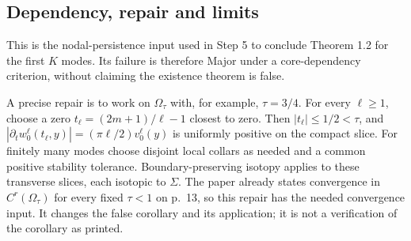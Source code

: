 \documentclass[10pt]{article}
\begin{document}
\subsection*{Dependency, repair and limits}
This is the nodal-persistence input used in Step 5 to conclude Theorem 1.2 for the first \(K\) modes. Its failure is therefore Major under a core-dependency criterion, without claiming the existence theorem is false.\par
A precise repair is to work on \(\Omega_\tau\) with, for example, \(\tau=3/4\). For every \(\ell\geq1\), choose a zero \(t_\ell=(2m+1)/\ell-1\) closest to zero. Then \(|t_\ell|\leq1/2<\tau\), and \(|\partial_t w_0^\ell(t_\ell,y)|
=(\pi\ell/2)v_0^\ell(y)\) is uniformly positive on the compact slice. For finitely many modes choose disjoint local collars as needed and a common positive stability tolerance. Boundary-preserving isotopy applies to these transverse slices, each isotopic to \(\Sigma\). The paper already states convergence in \(C^r(\Omega_\tau)\) for every fixed \(\tau<1\) on p. 13, so this repair has the needed convergence input. It changes the false corollary and its application; it is not a verification of the corollary as printed.\par
\end{document}
